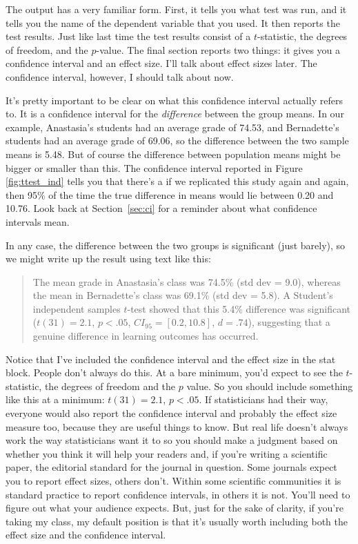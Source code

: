The output has a very familiar form. First, it tells you what test was run, and it tells you the name of the dependent variable that you used. It then reports the test results. Just like last time the test results consist of a $t$-statistic, the degrees of freedom, and the $p$-value. The final section reports two things: it gives you a confidence interval and an effect size. I'll talk about effect sizes later. The confidence interval, however, I should talk about now. 

It's pretty important to be clear on what this confidence interval actually refers to. It is a confidence interval for the {\it difference} between the group means. In our example, Anastasia's students had an average grade of 74.53, and Bernadette's students had an average grade of 69.06, so the difference between the two sample means is 5.48. But of course the difference between population means might be bigger or smaller than this. The confidence interval reported in Figure \ref{fig:ttest_ind} tells you that there's a if we replicated this study again and again, then 95\% of the time the true difference in means would lie between 0.20 and 10.76. Look back at Section~\ref{sec:ci} for a reminder about what confidence intervals mean.  

In any case, the difference between the two groups is significant (just barely), so we might write up the result using text like this:
\begin{quote}
The mean grade in Anastasia's class was 74.5\% (std dev = 9.0), whereas the mean in Bernadette's class was 69.1\% (std dev = 5.8). A Student's independent samples $t$-test showed that this 5.4\% difference was significant ($t(31) = 2.1$, $p<.05$, $CI_{95} = [0.2, 10.8]$, $d = .74$), suggesting that a genuine difference in learning outcomes has occurred.  
\end{quote}
Notice that I've included the confidence interval and the effect size in the stat block. People don't always do this. At a bare minimum, you'd expect to see the $t$-statistic, the degrees of freedom and the $p$ value. So you should include something like this at a minimum: $t(31) = 2.1$, $p<.05$. If statisticians had their way, everyone would also report the confidence interval and probably the effect size measure too, because they are useful things to know. But real life doesn't always work the way statisticians want it to so you should make a judgment based on whether you think it will help your readers and, if you’re writing a scientific paper, the editorial standard for the journal in question. Some journals expect you to report effect sizes, others don't. Within some scientific communities it is standard practice to report confidence intervals, in others it is not. You'll need to figure out what your audience expects. But, just for the sake of clarity, if you're taking my class, my default position is that it's usually worth including both the effect size and the confidence interval.
 
